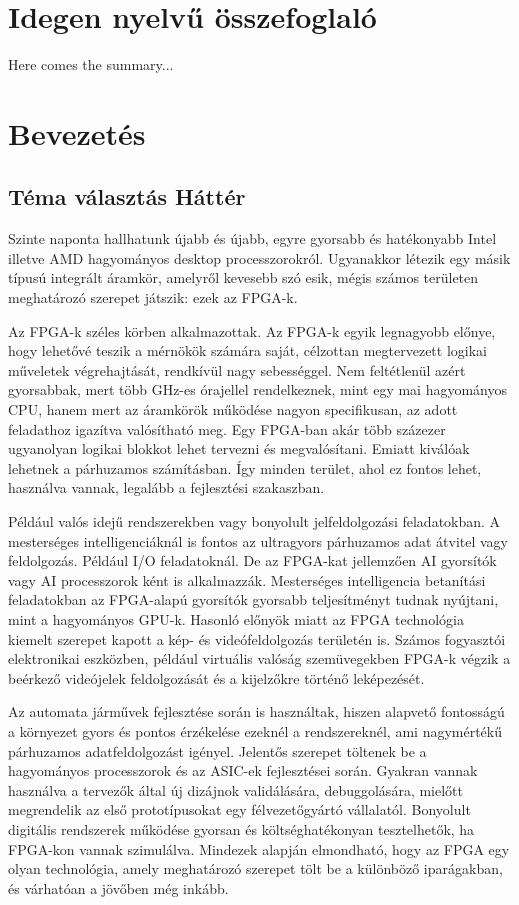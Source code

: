 \documentclass[a4paper,12pt,oneside]{book}
\begin{document}
\chapter{Idegen nyelvű összefoglaló}
Here comes the summary...


\chapter{Bevezetés}
\section{Téma választás Háttér}
Szinte naponta hallhatunk újabb és újabb, egyre gyorsabb és hatékonyabb Intel illetve AMD hagyományos desktop processzorokról. Ugyanakkor létezik egy másik típusú integrált áramkör, amelyről kevesebb szó esik, mégis számos területen meghatározó szerepet játszik: ezek az FPGA-k. 

Az FPGA-k széles körben alkalmazottak. Az FPGA-k egyik legnagyobb előnye, hogy lehetővé teszik a mérnökök számára saját, célzottan megtervezett logikai műveletek végrehajtását, rendkívül nagy sebességgel. Nem feltétlenül azért gyorsabbak, mert több GHz-es órajellel rendelkeznek, mint egy mai hagyományos CPU, hanem mert az áramkörök működése nagyon specifikusan, az adott feladathoz igazítva valósítható meg. Egy FPGA-ban akár több százezer ugyanolyan logikai blokkot lehet tervezni és megvalósítani. Emiatt kiválóak lehetnek a párhuzamos számításban. Így minden terület, ahol ez fontos lehet, használva vannak, legalább a fejlesztési szakaszban. 

Például valós idejű rendszerekben vagy bonyolult jelfeldolgozási feladatokban. A mesterséges intelligenciáknál is fontos az ultragyors párhuzamos adat átvitel vagy feldolgozás. Például I/O feladatoknál. De az FPGA-kat jellemzően AI gyorsítók vagy AI processzorok ként is alkalmazzák. Mesterséges intelligencia betanítási feladatokban az FPGA-alapú gyorsítók gyorsabb teljesítményt tudnak nyújtani, mint a hagyományos GPU-k. Hasonló előnyök miatt az FPGA technológia kiemelt szerepet kapott a kép- és videófeldolgozás területén is. Számos fogyasztói elektronikai eszközben, például virtuális valóság szemüvegekben FPGA-k végzik a beérkező videójelek feldolgozását és a kijelzőkre történő leképezését. 

Az automata járművek fejlesztése során is használtak, hiszen alapvető fontosságú a környezet gyors és pontos érzékelése ezeknél a rendszereknél, ami nagymértékű párhuzamos adatfeldolgozást igényel. Jelentős szerepet töltenek be a hagyományos processzorok és az ASIC-ek fejlesztései során. Gyakran vannak használva a tervezők által új dizájnok validálására, debuggolására, mielőtt megrendelik az első prototípusokat egy félvezetőgyártó vállalatól. Bonyolult digitális rendszerek működése gyorsan és költséghatékonyan tesztelhetők, ha FPGA-kon vannak szimulálva. Mindezek alapján elmondható, hogy az FPGA egy olyan technológia, amely meghatározó szerepet tölt be a különböző iparágakban, és várhatóan a jövőben még inkább. 
\end{document}
